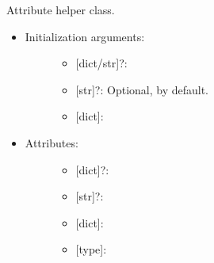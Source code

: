 \documentclass[letterpaper,10pt,english]{sphinxmanual}
\begin{document}
\begin{fulllineitems}
\begin{fulllineitems}
\begin{quote}
\begin{description}
\end{description}\end{quote}

\end{fulllineitems}


\end{fulllineitems}


\begin{fulllineitems}
\label{\detokenize{main:pypath.main.AttrHelper}}
Attribute helper class.
\begin{itemize}
\item {} \begin{description}
\item[{Initialization arguments:}] \leavevmode\begin{itemize}
\item {} 
 {[}dict/str{]}?:

\item {} 
 {[}str{]}?: Optional,  by default.

\item {} 
 {[}dict{]}:

\end{itemize}

\end{description}

\item {} \begin{description}
\item[{Attributes:}] \leavevmode\begin{itemize}
\item {} 
 {[}dict{]}?:

\item {} 
 {[}str{]}?:

\item {} 
 {[}dict{]}:

\item {} 
 {[}type{]}:

\end{itemize}


\end{description}
\end{itemize}
\end{fulllineitems}
\end{document}
